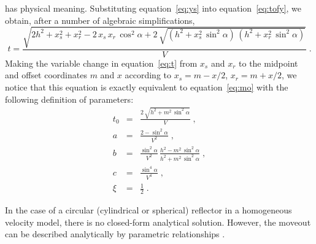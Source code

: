 has physical meaning. Substituting equation~\ref{eq:ys} into
equation~\ref{eq:tofy}, we obtain, after a number of algebraic
simplifications,
\begin{equation}
  \label{eq:t}
  t = \frac{\sqrt{2 h^2 + x_s^2 + x_r^2 - 2\,x_s\,x_r\,\cos^2{\alpha} + 
      2\,\sqrt{(h^2+x_s^2\,\sin^2{\alpha})\,(h^2+x_r^2\,\sin^2{\alpha})}}}{V}\;.
\end{equation}
Making the variable change in equation~\ref{eq:t} from $x_s$ and $x_r$
to the midpoint and offset coordinates $m$ and $x$ according to
$x_s=m-x/2$, $x_r=m+x/2$, we notice that this equation is exactly
equivalent to equation~\ref{eq:mo} with the following definition of
parameters:
\begin{eqnarray}
\label{eq:th}
t_0 & = & \frac{2\,\sqrt{h^2 + m^2\,\sin^2{\alpha}}}{V}\;, \\
\label{eq:ah}
a & = & \frac{2-\sin^2{\alpha}}{V^2}\;, \\
\label{eq:bh}
b & = & \frac{\sin^2{\alpha}}{V^2}\,\frac{h^2 - m^2\,\sin^2{\alpha}}{h^2 + m^2\,\sin^2{\alpha}}\;, \\
\label{eq:ch}
c & = & \frac{\sin^4{\alpha}}{V^4}\;, \\
\label{eq:xh}
\xi & = & \frac{1}{2}\;.
\end{eqnarray}


In the case of a circular (cylindrical or spherical) reflector in a
homogeneous velocity model, there is no closed-form analytical
solution. However, the moveout can be described analytically by
parametric relationships \cite[]{mirror}.


